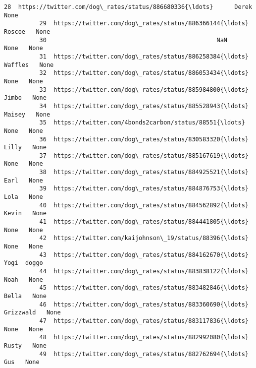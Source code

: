 \documentclass[11pt]{article}
\begin{document}
\begin{Verbatim}[commandchars=\\\{\}]
          28  https://twitter.com/dog\_rates/status/886680336{\ldots}      Derek   None   
          29  https://twitter.com/dog\_rates/status/886366144{\ldots}     Roscoe   None   
          30                                                NaN       None   None   
          31  https://twitter.com/dog\_rates/status/886258384{\ldots}    Waffles   None   
          32  https://twitter.com/dog\_rates/status/886053434{\ldots}       None   None   
          33  https://twitter.com/dog\_rates/status/885984800{\ldots}      Jimbo   None   
          34  https://twitter.com/dog\_rates/status/885528943{\ldots}     Maisey   None   
          35  https://twitter.com/4bonds2carbon/status/88551{\ldots}       None   None   
          36  https://twitter.com/dog\_rates/status/830583320{\ldots}      Lilly   None   
          37  https://twitter.com/dog\_rates/status/885167619{\ldots}       None   None   
          38  https://twitter.com/dog\_rates/status/884925521{\ldots}       Earl   None   
          39  https://twitter.com/dog\_rates/status/884876753{\ldots}       Lola   None   
          40  https://twitter.com/dog\_rates/status/884562892{\ldots}      Kevin   None   
          41  https://twitter.com/dog\_rates/status/884441805{\ldots}       None   None   
          42  https://twitter.com/kaijohnson\_19/status/88396{\ldots}       None   None   
          43  https://twitter.com/dog\_rates/status/884162670{\ldots}       Yogi  doggo   
          44  https://twitter.com/dog\_rates/status/883838122{\ldots}       Noah   None   
          45  https://twitter.com/dog\_rates/status/883482846{\ldots}      Bella   None   
          46  https://twitter.com/dog\_rates/status/883360690{\ldots}  Grizzwald   None   
          47  https://twitter.com/dog\_rates/status/883117836{\ldots}       None   None   
          48  https://twitter.com/dog\_rates/status/882992080{\ldots}      Rusty   None   
          49  https://twitter.com/dog\_rates/status/882762694{\ldots}        Gus   None   
          

\end{Verbatim}
\end{document}
